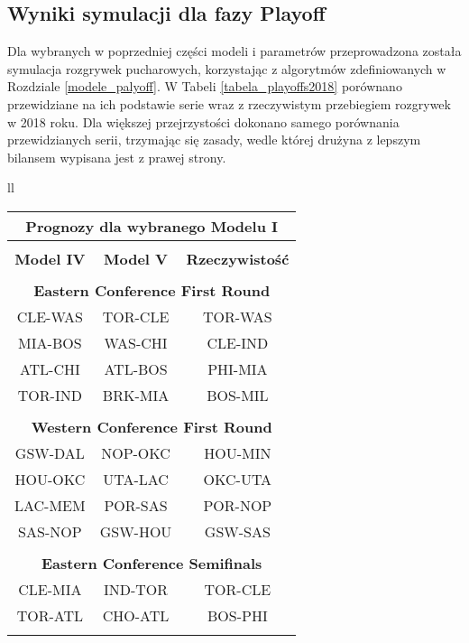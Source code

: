 \documentclass[inzynierska]{pwr_wmat_praca_dyplomowa}
\theoremstyle{plain}
\numberwithin{theorem}{chapter}
\theoremstyle{definition}
\numberwithin{theorem}{chapter}
\begin{document}
\subsection{Wyniki symulacji dla fazy Playoff}
Dla wybranych w poprzedniej części modeli i parametrów przeprowadzona została symulacja rozgrywek pucharowych, korzystając z algorytmów zdefiniowanych w Rozdziale \ref{modele_palyoff}. W Tabeli \ref{tabela_playoffs2018} porównano przewidziane na ich podstawie serie wraz z rzeczywistym przebiegiem rozgrywek w 2018 roku. Dla większej przejrzystości dokonano samego porównania przewidzianych serii, trzymając się zasady, wedle której drużyna z lepszym bilansem wypisana jest z prawej strony. 

\begin{table}[]
	\centering
	\begin{tabular}{ll}

	\begin{tabular}{|c|c|c|}
	\hline
	\multicolumn{3}{|c|}{\textbf{Prognozy dla wybranego Modelu I}} \\\hline
	\multicolumn{3}{|c|}{} \\\hline	
	\textbf{Model IV}& \textbf{Model V} &\textbf{Rzeczywistość}\\\hline	
	
	\multicolumn{3}{|c|}{} \\\hline	
	\multicolumn{3}{|c|}{\textbf{Eastern Conference First Round}} \\\hline
	CLE-WAS&TOR-CLE  &TOR-WAS\\\hline
	MIA-BOS&WAS-CHI &CLE-IND\\\hline
	ATL-CHI&ATL-BOS &PHI-MIA\\\hline
	TOR-IND&BRK-MIA &BOS-MIL\\\hline
	\multicolumn{3}{|c|}{} \\\hline
	
	\multicolumn{3}{|c|}{\textbf{Western Conference First Round}} \\\hline
	GSW-DAL&NOP-OKC &HOU-MIN\\\hline
	HOU-OKC&UTA-LAC &OKC-UTA\\\hline
	LAC-MEM&POR-SAS &POR-NOP\\\hline
	SAS-NOP&GSW-HOU &GSW-SAS\\\hline
	\multicolumn{3}{|c|}{} \\\hline
	
	\multicolumn{3}{|c|}{\textbf{Eastern Conference Semifinals}} \\\hline
	CLE-MIA&IND-TOR &TOR-CLE\\\hline
	TOR-ATL&CHO-ATL &BOS-PHI\\\hline
	\multicolumn{3}{|c|}{} \\\hline
	

\end{tabular}
\end{tabular}
\end{table}
\end{document}
